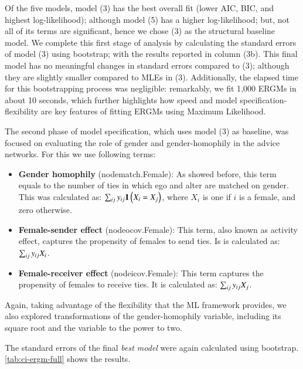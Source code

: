 \documentclass[review, nonatbib,doubleblind]{elsarticle/elsarticle}
\begin{document}
Of the five models, model (3) has the best overall fit (lower AIC, BIC, and highest log-likelihood); although model (5) has a higher log-likelihood; but, not all of its terms are significant, hence we chose (3) as the structural baseline model. We complete this first stage of analysis by calculating the standard errors of model (3) using bootstrap; with the results reported in column (3b). This final model has no meaningful changes in standard errors compared to (3); although they are slightly smaller compared to MLEs in (3). Additionally, the elapsed time for this bootstrapping process was negligible: remarkably, we fit 1,000 ERGMs in about 10 seconds, which further highlights how speed and model specification-flexibility are key features of fitting ERGMs using Maximum Likelihood.

The second phase of model specification, which uses model (3) as baseline, was focused on evaluating the role of gender and gender-homophily in the advice networks. For this we use following terms: 

\begin{itemize}
    \item \textbf{Gender homophily} (nodematch.Female): As showed before, this term equals to the number of ties in which ego and alter are matched on gender. This was calculated as: $\sum_{ij}y_{ij}{\boldsymbol{1}\left( X_{i} = X_{j} \right)}$, where $X_i$ is one if $i$ is a female, and zero otherwise.
    \item \textbf{Female-sender effect} (nodeocov.Female): This term, also known as activity effect, captures the propensity of females to send ties. Is is calculated as: $\sum_{ij}y_{ij}X_{i}$.
    \item \textbf{Female-receiver effect} (nodeicov.Female): This term captures the propensity of females to receive ties. It is calculated as: $\sum_{ij}y_{ij}X_{j}$.
\end{itemize}
Again, taking advantage of the flexibility that the ML framework provides, we also explored transformations of the gender-homophily variable, including its square root and the variable to the power to two. 

The standard errors of the  final \textit{best model} were again calculated using bootstrap. \autoref{tab:ci-ergm-full} shows the results.


\end{document}
